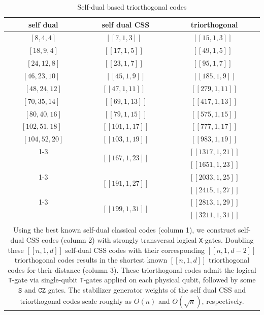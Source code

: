 \documentclass[journal]{IEEEtran}
\newcommand{\T}{\texttt{T}}
\newcommand{\X}{\texttt{X}}
\begin{document}
\begin{table}[t]
\caption{Self-dual based triorthogonal codes}
\label{tab:triortho}
\centering
\begin{tabular}{ccc}
\toprule 
self dual  & self dual CSS  & triorthogonal \tabularnewline
\midrule 
$[8,4,4]$ & $[[7,1,3]]$~\cite{steane_multiple_1996}  & $[[15,1,3]]$~\cite{bravyi_doubled_2015} \tabularnewline
\midrule 
 $[18,9,4]$ & $[[17,1,5]]$~\cite{bombin_topological_2006}  & $[[49,1,5]]$~\cite{bravyi_doubled_2015}\tabularnewline
\midrule 
$[24,12,8]$ & $[[23,1,7]]$~\cite{steane_simple_1996}  & $[[95,1,7]]$~\cite{sullivan_code_2024}\tabularnewline
\midrule 
$[46,23,10]$~\cite{harada_extremal_2000} & $[[45,1,9]]$  & $[[185,1,9]]$ \tabularnewline
\midrule 
$[48,24,12]$ & $[[47,1,11]]$~\cite{cross_comparative_2009}  & $[[279,1,11]]$ \tabularnewline
\midrule 
$[70,35,14]$~\cite{gulliver_existence_1998} & $[[69,1,13]]$  & $[[417,1,13]]$ \tabularnewline
\midrule 
{$[80,40,16]$} & {$[[79,1,15]]$} & $[[575,1,15]]$\tabularnewline \midrule
{$[102,51,18]$}~\cite{g_philippe_tables_2007}& {$[[101,1,17]]$} & $[[777,1,17]]$\tabularnewline \midrule
 {$[104,52,20]$}& {$[[103,1,19]]$} & $[[983,1,19]]$\tabularnewline
\cmidrule{1-3}
\multirow{2}{*}{$[168,84,24]$} & \multirow{2}{*}{$[[167,1,23]]$} & $[[1317,1,21]]$\tabularnewline
 &  & $[[1651,1,23]]$\tabularnewline
\cmidrule{1-3}
\multirow{2}{*}{$[192,96,28]$} & \multirow{2}{*}{$[[191,1,27]]$} & $[[2033,1,25]]$\tabularnewline
 &  & $[[2415,1,27]]$\tabularnewline
\cmidrule{1-3}
\multirow{2}{*}{$[200,100,32]$} & \multirow{2}{*}{$[[199,1,31]]$} & $[[2813,1,29]]$\tabularnewline
 &  & $[[3211,1,31]]$\tabularnewline\bottomrule
 \\
 \multicolumn{3}{p{251pt}}{Using the best known self-dual classical codes (column 1), we construct self-dual CSS codes (column 2) with strongly transversal logical \X-gates. Doubling these $[[n,1,d]]$ self-dual CSS codes with their corresponding $[[n,1,d-2]]$ triorthogonal codes results in the shortest known $[[n,1,d]]$ triorthogonal codes for their distance (column 3). These triorthogonal codes admit the logical \T-gate via single-qubit \T-gates applied on each physical qubit, followed by some $\texttt{S}$ and $\texttt{CZ}$ gates. The stabilizer generator weights of the self dual CSS and triorthogonal codes scale roughly as $O(n)$ and $O(\sqrt{n})$, respectively.}

\end{tabular}
\end{table}
\end{document}
